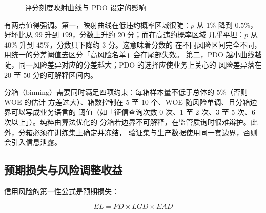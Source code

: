 \begin{figure}[htbp]
\centering
{}
\caption{评分刻度映射曲线与 PDO 设定的影响}\label{fig:02-scoremap}
\end{figure}

 有两点值得强调。第一，映射曲线在低违约概率区域很陡：$p$ 从
$1\%$ 降到 $0.5\%$，好坏比从 $99$ 升到 $199$，分数上升约 20 分；而在高违约概率区域
几乎平坦：$p$ 从 $40\%$ 升到 $45\%$，分数只下降约 3 分。这意味着分数的
在不同风险区间完全不同，用统一的分差阈值去区分「高风险名单」会在尾部失效。
第二，PDO 越小曲线越陡，同一风险差异对应的分差越大；PDO 的选择应使业务上关心的
风险差异落在 $20$ 至 $50$ 分的可解释区间内。

\begin{appbox}[分箱的工程约束]
分箱（binning）需要同时满足四项约束：每箱样本量不低于总体的 $5\%$（否则 WOE 的估计
方差过大）、箱数控制在 $5$ 至 $10$ 个、WOE 随风险单调、且分箱边界可以写成业务语言的
阈值（如「征信查询次数 0 次、1 至 2 次、3 至 5 次、6 次以上」）。纯粹由算法优化的
分箱若边界不可解释，在监管质询时很难辩护。此外，分箱必须在训练集上确定并冻结，
验证集与生产数据使用同一套边界，否则会引入信息泄露。
\end{appbox}

\subsection{预期损失与风险调整收益}

信用风险的第一性公式是预期损失：

\begin{equation}\label{eq:02-el}
  EL = PD \times LGD \times EAD
\end{equation}

